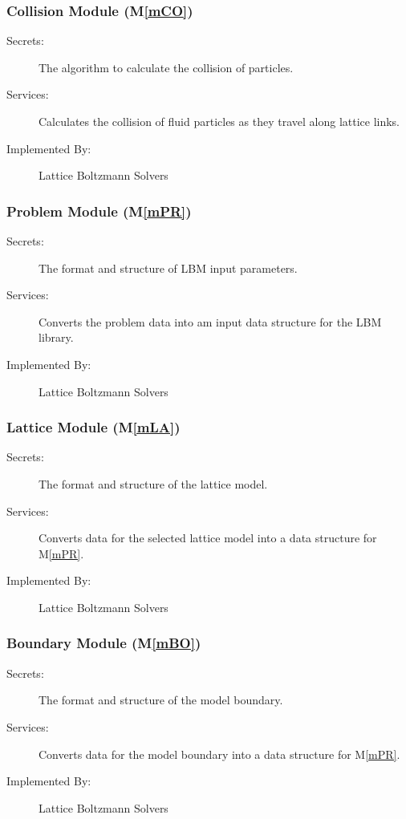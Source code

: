 \documentclass[12pt, titlepage]{article}
\newcommand{\mref}[1]{M\ref{#1}}
\newcommand{\famname}{Lattice Boltzmann Solvers} %
\begin{document}
\subsubsection{Collision Module (\mref{mCO})}

\begin{description}
	\item[Secrets:]The algorithm to calculate the collision of particles.
	\item[Services:]Calculates the collision of fluid particles as they travel along lattice links.
	\item[Implemented By:] \famname
\end{description}

\subsubsection{Problem Module (\mref{mPR})}

\begin{description}
	\item[Secrets:]The format and structure of LBM input parameters.
	\item[Services:]Converts the problem data into am input data structure for the LBM library.
	\item[Implemented By:] \famname
\end{description}

\subsubsection{Lattice Module (\mref{mLA})}

\begin{description}
	\item[Secrets:]The format and structure of the lattice model.
	\item[Services:]Converts data for the selected lattice model into a data structure for \mref{mPR}.
	\item[Implemented By:] \famname
\end{description}

\subsubsection{Boundary Module (\mref{mBO})}

\begin{description}
	\item[Secrets:]The format and structure of the model boundary.
	\item[Services:]Converts data for the model boundary into a data structure for \mref{mPR}.
	\item[Implemented By:] \famname
\end{description}
\end{document}
